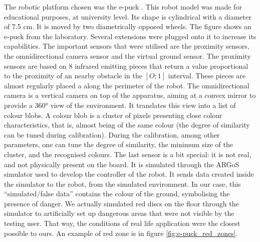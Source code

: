 \documentclass[oneside, a4paper, 12pt]{memoir}
\begin{document}
		The robotic platform chosen was the e-puck \citep{mondada2009puck}. This robot model was made for educational purposes, at university level. Its shape is cylindrical with a diameter of 7.5 cm. It is moved by two diametrically opposed wheels. The figure shows an e-puck from the laboratory. Several extensions were plugged onto it to increase its capabilities. The important sensors that were utilised are the proximity sensors, the omnidirectional camera sensor and the virtual ground sensor. The proximity sensors are based on 8 infrared emitting pieces that return a value proportional to the proximity of an nearby obstacle in the $[O;1]$ interval. These pieces are almost regularly placed a along the perimeter of the robot. The omnidirectional camera is a vertical camera on top of the apparatus, aiming at a convex mirror to provide a 360° view of the environment. It translates this view into a list of colour blobs. A colour blob is a cluster of pixels presenting close colour characteristics, that is, almost being of the same colour (the degree of similarity can be tuned during calibration). During the calibration, among other parameters, one can tune the degree of similarity, the minimum size of the cluster, and the recognised colours. The last sensor is a bit special: it is not real, and not physically present on the board. It is simulated through the ARGoS simulator used to develop the controller of the robot. It sends data created inside the simulator to the robot, from the simulated environment. In our case, this \enquote{simulated/false data} contains the colour of the ground, symbolising the presence of danger. We actually simulated red discs on the floor through the simulator to artificially set up dangerous areas that were not visible by the testing user. That way, the conditions of real life application were the closest possible to ours. An example of red zone is in figure \ref{fig:e-puck_red_zones}.
		
\end{document}

